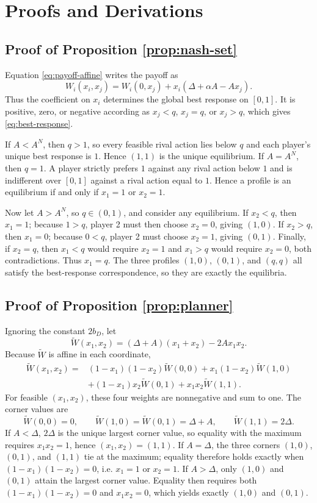 \section{Proofs and Derivations}
\label{app:proofs}

\subsection{Proof of Proposition \ref{prop:nash-set}}

Equation \eqref{eq:payoff-affine} writes the payoff as
\[
W_i(x_i,x_j)
=W_i(0,x_j)+x_i\left(\Delta+\alpha A-Ax_j\right).
\]
Thus the coefficient on $x_i$ determines the global best response on $[0,1]$. It is positive, zero, or negative according as $x_j<q$, $x_j=q$, or $x_j>q$, which gives \eqref{eq:best-response}.

If $A<A^N$, then $q>1$, so every feasible rival action lies below $q$ and each player's unique best response is $1$. Hence $(1,1)$ is the unique equilibrium. If $A=A^N$, then $q=1$. A player strictly prefers $1$ against any rival action below $1$ and is indifferent over $[0,1]$ against a rival action equal to $1$. Hence a profile is an equilibrium if and only if $x_1=1$ or $x_2=1$.

Now let $A>A^N$, so $q\in(0,1)$, and consider any equilibrium. If $x_2<q$, then $x_1=1$; because $1>q$, player 2 must then choose $x_2=0$, giving $(1,0)$. If $x_2>q$, then $x_1=0$; because $0<q$, player 2 must choose $x_2=1$, giving $(0,1)$. Finally, if $x_2=q$, then $x_1<q$ would require $x_2=1$ and $x_1>q$ would require $x_2=0$, both contradictions. Thus $x_1=q$. The three profiles $(1,0)$, $(0,1)$, and $(q,q)$ all satisfy the best-response correspondence, so they are exactly the equilibria.

\subsection{Proof of Proposition \ref{prop:planner}}

Ignoring the constant $2b_D$, let
\[
\widetilde W(x_1,x_2)
=(\Delta+A)(x_1+x_2)-2Ax_1x_2.
\]
Because $\widetilde W$ is affine in each coordinate,
\begin{align*}
\widetilde W(x_1,x_2)
={}&(1-x_1)(1-x_2)\widetilde W(0,0)
+x_1(1-x_2)\widetilde W(1,0)\\
&+(1-x_1)x_2\widetilde W(0,1)
+x_1x_2\widetilde W(1,1).
\end{align*}
For feasible $(x_1,x_2)$, these four weights are nonnegative and sum to one. The corner values are
\[
\widetilde W(0,0)=0,
\qquad
\widetilde W(1,0)=\widetilde W(0,1)=\Delta+A,
\qquad
\widetilde W(1,1)=2\Delta.
\]
If $A<\Delta$, $2\Delta$ is the unique largest corner value, so equality with the maximum requires $x_1x_2=1$, hence $(x_1,x_2)=(1,1)$. If $A=\Delta$, the three corners $(1,0)$, $(0,1)$, and $(1,1)$ tie at the maximum; equality therefore holds exactly when $(1-x_1)(1-x_2)=0$, i.e. $x_1=1$ or $x_2=1$. If $A>\Delta$, only $(1,0)$ and $(0,1)$ attain the largest corner value. Equality then requires both $(1-x_1)(1-x_2)=0$ and $x_1x_2=0$, which yields exactly $(1,0)$ and $(0,1)$.

